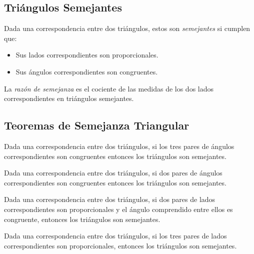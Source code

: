 \subsection{Triángulos Semejantes}

\begin{definition}
    Dada una correspondencia entre dos triángulos, estos son \textit{semejantes} si cumplen que:

    \begin{itemize}
        \item Sus lados correspondientes son proporcionales.
        \item Sus ángulos correspondientes son congruentes.
    \end{itemize}
    
\end{definition}

\begin{definition}
    La \textit{razón de semejanza} es el cociente de las medidas de los dos lados correspondientes en triángulos semejantes.
\end{definition}


\subsection{Teoremas de Semejanza Triangular}

\begin{theorem}
    Dada una correspondencia entre dos triángulos, si los tres pares de ángulos correspondientes son congruentes entonces los triángulos son semejantes.
\end{theorem}


\begin{theorem}
    Dada una correspondencia entre dos triángulos, si dos pares de ángulos correspondientes son congruentes entonces los triángulos son semejantes.
\end{theorem}


\begin{theorem}
    Dada una correspondencia entre dos triángulos, si dos pares de lados correspondientes son proporcionales y el ángulo comprendido entre ellos es congruente, entonces los triángulos son semejantes.
\end{theorem}

\begin{theorem}
    Dada una correspondencia entre dos triángulos, si los tres pares de lados correspondientes son proporcionales, entonces los triángulos son semejantes.
\end{theorem}


